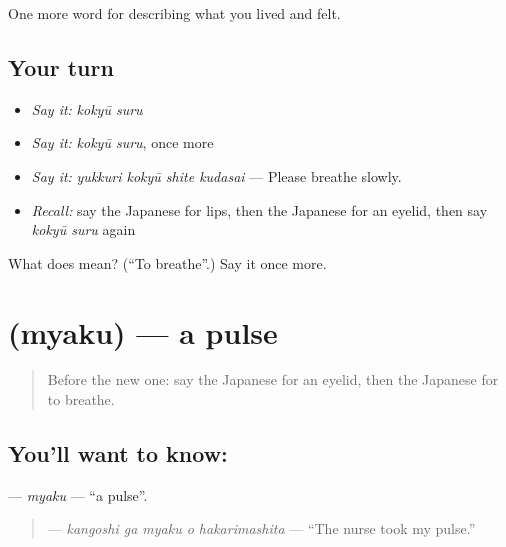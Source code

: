 \begin{grammarlens}[title={What you've built}]
One more word for describing what you lived and felt.
\end{grammarlens}

\subsection*{Your turn}
\begin{itemize}
\raggedright
  \item \emph{Say it:} \emph{kokyū suru}
  \item \emph{Say it:} \emph{kokyū suru}, once more
  \item \emph{Say it:} \emph{yukkuri kokyū shite kudasai} — Please breathe slowly.
  \item \emph{Recall:} say the Japanese for lips, then the Japanese for an eyelid, then say \emph{kokyū suru} again
\end{itemize}

\begin{tcolorbox}[breakable,colback=teal!4,colframe=teal!35!black,title={Before you move on}]
What does  mean? (\textquotedblleft{}To breathe\textquotedblright{}.) Say it once more.
\end{tcolorbox}
\section[\texorpdfstring{\ja{みゃく} (myaku)}{みゃく (myaku)}]{ (myaku) — a pulse}

\label{lesson:JA-C444-myaku}



\begin{quote}
Before the new one: say the Japanese for an eyelid, then the Japanese for to breathe.
\end{quote}

\subsection*{You'll want to know: }
\textbf{} — \emph{myaku} — \textquotedblleft{}a pulse\textquotedblright{}.

\begin{quote}
\textbf{  } — \emph{kangoshi ga myaku o hakarimashita} — \textquotedblleft{}The nurse took my pulse.\textquotedblright{}
\end{quote}


